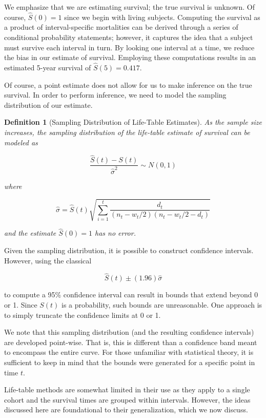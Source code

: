 \documentclass[
]{book}
\theoremstyle{plain}
\theoremstyle{mydefn}
\newtheorem{definition}{Definition}[chapter]
\theoremstyle{myexmpl}
\theoremstyle{remark}
\begin{document}
We emphasize that we are estimating survival; the true survival is unknown. Of course, \(\widehat{S}(0) = 1\) since we begin with living subjects. Computing the survival as a product of interval-specific mortalities can be derived through a series of conditional probability statements; however, it captures the idea that a subject must survive each interval in turn. By looking one interval at a time, we reduce the bias in our estimate of survival. Employing these computations results in an estimated 5-year survival of \(\widehat{S}(5) = 0.417.\)

Of course, a point estimate does not allow for us to make inference on the true survival. In order to perform inference, we need to model the sampling distribution of our estimate.

\begin{definition}[Sampling Distribution of Life-Table Estimates]
As the sample size increases, the sampling distribution of the life-table estimate of survival can be modeled as

\[\frac{\widehat{S}(t) - S(t)}{\widehat{\sigma}^2} \sim N(0, 1)\]

where

\[\widehat{\sigma} = \widehat{S}(t) \sqrt{\sum\limits_{i=1}^t \frac{d_t}{\left(n_{t} - w_t/2\right)\left(n_{t} - w_t/2 - d_t\right)}}\]

and the estimate \(\widehat{S}(0) = 1\) has no error.
\end{definition}

Given the sampling distribution, it is possible to construct confidence intervals. However, using the classical

\[\widehat{S}(t) \pm (1.96) \widehat{\sigma}\]

to compute a 95\% confidence interval can result in bounds that extend beyond 0 or 1. Since \(S(t)\) is a probability, such bounds are unreasonable. One approach is to simply truncate the confidence limits at 0 or 1.

We note that this sampling distribution (and the resulting confidence intervals) are developed point-wise. That is, this is different than a confidence band meant to encompass the entire curve. For those unfamiliar with statistical theory, it is sufficient to keep in mind that the bounds were generated for a specific point in time \(t\).

Life-table methods are somewhat limited in their use as they apply to a single cohort and the survival times are grouped within intervals. However, the ideas discussed here are foundational to their generalization, which we now discuss.
\end{document}

